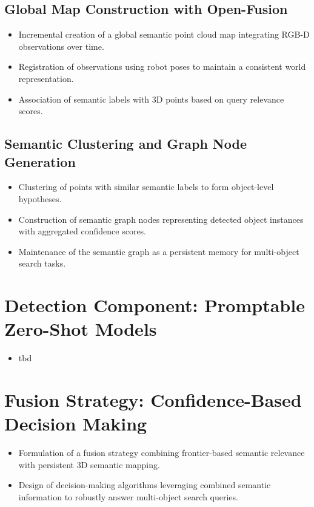 \subsection{Global Map Construction with Open-Fusion}
\begin{itemize}
    \item Incremental creation of a global semantic point cloud map integrating RGB-D observations over time.
    \item Registration of observations using robot poses to maintain a consistent world representation.
    \item Association of semantic labels with 3D points based on query relevance scores.
\end{itemize}

\subsection{Semantic Clustering and Graph Node Generation}
\begin{itemize}
    \item Clustering of points with similar semantic labels to form object-level hypotheses.
    \item Construction of semantic graph nodes representing detected object instances with aggregated confidence scores.
    \item Maintenance of the semantic graph as a persistent memory for multi-object search tasks.
\end{itemize}

\section{Detection Component: Promptable Zero-Shot Models}
\begin{itemize}
    \item tbd
\end{itemize}

\section{Fusion Strategy: Confidence-Based Decision Making}
\begin{itemize}
    \item Formulation of a fusion strategy combining frontier-based semantic relevance with persistent 3D semantic mapping.
    \item Design of decision-making algorithms leveraging combined semantic information to robustly answer multi-object search queries.
\end{itemize}
